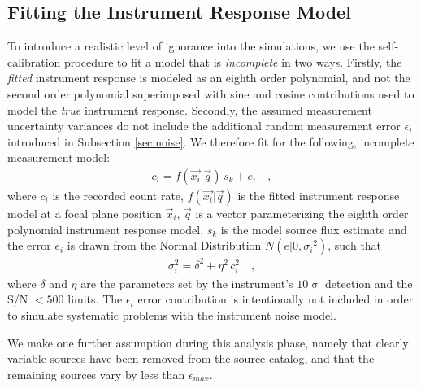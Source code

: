 \documentclass[preprint,pdftex]{aastex}
\begin{document}
\subsection{Fitting the Instrument Response Model}
To introduce a realistic level of ignorance into the simulations, we use the self-calibration procedure to fit a model that is \textit{incomplete} in two ways. Firstly, the \textit{fitted} instrument response is modeled as an eighth order polynomial, and not the second order polynomial superimposed with sine and cosine contributions used to model the \textit{true} instrument response. Secondly, the assumed measurement uncertainty variances do not include the additional random measurement error $\epsilon_{i}$ introduced in Subsection \ref{sec:noise}. We therefore fit for the following, incomplete measurement model:
\begin{eqnarray*}
c_i = f(\vec{x_i} | \vec{q}) \, s_{k} + e_{i} \quad ,
\end{eqnarray*}
where $c_i$ is the recorded count rate, $f(\vec{x_i} | \vec{q})$ is the fitted instrument response model at a focal plane position $\vec{x}_i$, $\vec{q}$ is a vector parameterizing the eighth order polynomial instrument response model, $s_k$ is the model source flux estimate and the error $e_i$ is drawn from the Normal Distribution $N(e|0,{\sigma_i}^2)$, such that
\begin{eqnarray*}
\sigma_{{i}}^{2} = \delta^{2} + \eta^{2}\, c^{2}_i \quad ,
\end{eqnarray*} 
where $\delta$ and $\eta$ are the parameters set by the instrument's $10\upsigma$ detection and the S/N $<500$ limits. The $\epsilon_i$ error contribution is intentionally not included in order to simulate systematic problems with the instrument noise model. 

We make one further assumption during this analysis phase, namely that clearly variable sources have been removed from the source catalog, and that the remaining sources vary by less than $\epsilon_{max}$.
\end{document}
